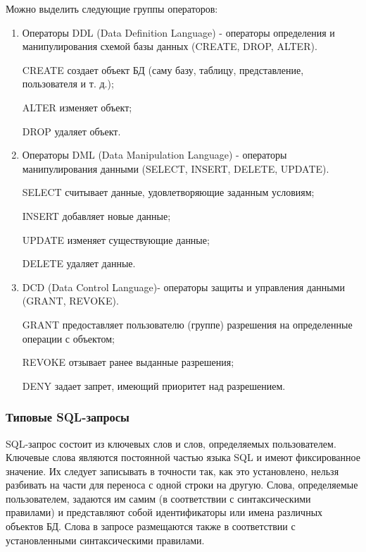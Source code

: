 \documentclass[12pt,a4paper,oneside]{article} %
\begin{document}
Можно выделить следующие группы операторов:

\begin{enumerate}
\item Операторы DDL (Data Definition Language) - операторы определения и \linebreak
    манипулирования схемой базы данных (CREATE, DROP, ALTER).

    CREATE создает объект БД (саму базу, таблицу, представление, \linebreak
    пользователя и т. д.);

    ALTER изменяет объект;

    DROP удаляет объект.

\item Операторы DML (Data Manipulation Language) - операторы \linebreak
манипулирования данными (SELECT, INSERT, DELETE, UPDATE).

    SELECT считывает данные, удовлетворяющие заданным условиям;

    INSERT добавляет новые данные;

    UPDATE изменяет существующие данные;

    DELETE удаляет данные.

\item DCD (Data Control Language)- операторы защиты и управления данными \linebreak
(GRANT, REVOKE).

    GRANT предоставляет пользователю (группе) разрешения на \linebreak
    определенные операции с объектом;

    REVOKE отзывает ранее выданные разрешения;

    DENY задает запрет, имеющий приоритет над разрешением.
\end{enumerate}

\subsubsection{Типовые SQL-запросы}

SQL-запрос состоит из ключевых слов и слов, определяемых пользователем. \linebreak
Ключевые слова являются постоянной частью языка SQL и имеют \linebreak
фиксированное значение. Их следует записывать в точности так, как это \linebreak
установлено, нельзя разбивать на части для переноса с одной строки \linebreak
на другую. Слова, определяемые пользователем, задаются им самим \linebreak
(в соответствии с синтаксическими правилами) и представляют собой \linebreak
идентификаторы или имена различных объектов БД. Слова в запросе \linebreak
размещаются также в соответствии с установленными синтаксическими \linebreak
правилами.
\end{document}
